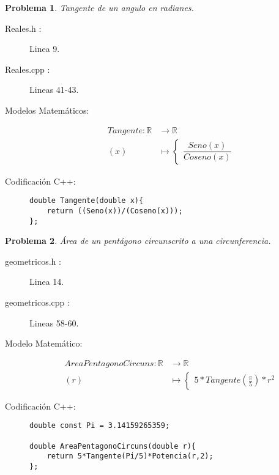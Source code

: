 \documentclass{article}
\theoremstyle{plain}
\theoremstyle{definition}
\newtheorem{problem}{Problema}
\begin{document}
\begin{problem} \emph{Tangente de un angulo en radianes.}\\
\begin{description}
\item[Reales.h :] Linea 9. \item[Reales.cpp :] Lineas 41-43.
\item[Modelos Matemáticos:]
\begin{align*}
Tangente: \mathbb{R} &\to \mathbb{R}\\
(x) &\mapsto \begin{cases}
\dfrac{Seno(x)}{Coseno(x)}
\end{cases}
\end{align*}
\item[Codificación \textsf{C++}:]\hfill
\begin{verbatim}
double Tangente(double x){
    return ((Seno(x))/(Coseno(x)));
};
\end{verbatim}
\end{description}
\end{problem}

\begin{problem} \emph{Área de un pentágono circunscrito a una circunferencia.}\\
\begin{description}
\item[geometricos.h :] Linea 14. \item[geometricos.cpp :] Lineas 58-60.

\item[Modelo Matemático:]
\begin{align*}
AreaPentagonoCircuns: \mathbb{R} &\to \mathbb{R}\\
(r) &\mapsto \begin{cases}
5*Tangente(\frac{\pi}{5})*r^{2}
\end{cases}
\end{align*}
%
\item[Codificación \textsf{C++}:]\hfill
%
\begin{verbatim}
double const Pi = 3.14159265359;

double AreaPentagonoCircuns(double r){
    return 5*Tangente(Pi/5)*Potencia(r,2);
};
\end{verbatim}
\end{description}
\end{problem}
\end{document}
